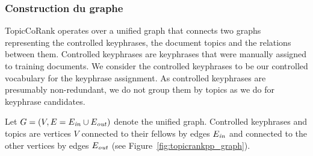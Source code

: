       \subsubsection{Construction du graphe}
      \label{subsubsec:main-automatic_keyphrase_annotation-supervised_automatic_keyphrase_extraction-topiccorank-graph_construction}
        TopicCoRank operates over a unified graph that connects two graphs
        representing the controlled keyphrases, the document topics and
        the relations between them. Controlled keyphrases are keyphrases
        that were manually assigned to training documents. We consider the 
        controlled keyphrases
        to be our controlled vocabulary for the keyphrase assignment. %
        As controlled keyphrases are presumably non-redundant, we do not 
        group them by topics as we do for keyphrase candidates.
        
        Let
        $G = (V, E=E_{\textnormal{\textit{in}}} \cup E_{\textnormal{\textit{out}}})$
        denote the unified graph. Controlled keyphrases and topics are vertices $V$
        connected to their fellows by edges $E_\textnormal{\textit{in}}$ and
        connected to the other vertices by edges $E_\textnormal{\textit{out}}$ (see
        Figure~\ref{fig:topicrankpp_graph}).
        
